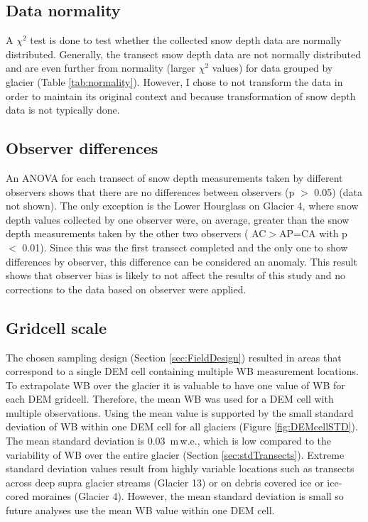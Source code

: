 \documentclass{sfuthesis}
\begin{document}
{\begin{appendices}
\subsection{Data normality}

A $\chi^2$ test is done to test whether the collected snow depth data are normally distributed. Generally, the transect snow depth data are not normally distributed and are even further from normality (larger $\chi^2$ values) for data grouped by glacier (Table \ref{tab:normality}). However, I chose to not transform the data in order to maintain its original context and because transformation of snow depth data is not typically done.  

\subsection{Observer differences}

An ANOVA for each transect of snow depth measurements taken by different observers shows that there are no differences between observers (p $>$ 0.05) (data not shown). The only exception is the Lower Hourglass on Glacier 4, where snow depth values collected by one observer were, on average, greater than the snow depth measurements taken by the other two observers ( AC$>$AP=CA with p $<$ 0.01). Since this was the first transect completed and the only one to show differences by observer, this difference can be considered an anomaly. This result shows that observer bias is likely to not affect the results of this study and no corrections to the data based on observer were applied.

\subsection{Gridcell scale}

The chosen sampling design (Section \ref{sec:FieldDesign}) resulted in areas that correspond to a single DEM cell containing multiple WB measurement locations. To extrapolate WB over the glacier it is valuable to have one value of WB for each DEM gridcell. Therefore, the mean WB was used for a DEM cell with multiple observations. Using the mean value is supported by the small standard deviation of WB within one DEM cell for all glaciers (Figure \ref{fig:DEMcellSTD}). The mean standard deviation is 0.03 \,m\,w.e., which is low compared to the variability of WB over the entire glacier (Section \ref{sec:stdTransects}). Extreme standard deviation values result from highly variable locations such as transects across deep supra glacier streams (Glacier 13) or on debris covered ice or ice-cored moraines (Glacier 4). However, the mean standard deviation is small so future analyses use the mean WB value within one DEM cell. 


\end{appendices}}
\end{document}
